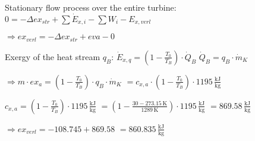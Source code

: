 Stationary flow process over the entire turbine:  
\( 0 = -\Delta ex_{str} + \sum \dot{E}_{x,i} - \sum W_i - E_{x,verl} \)  

\( \Rightarrow ex_{verl} = -\Delta ex_{str} + eva - 0 \)  

Exergy of the heat stream \( q_B \):  
\( \dot{E}_{x,q} = \left( 1 - \frac{T_0}{T_B} \right) \cdot \dot{Q}_B \)  
\( \dot{Q}_B = q_B \cdot \dot{m}_K \)  

\( \Rightarrow m \cdot ex_{a} = \left( 1 - \frac{T_0}{T_B} \right) \cdot q_B \cdot \dot{m}_K \)  
\( = c_{x,a} \cdot \left( 1 - \frac{T_0}{T_B} \right) \cdot 1195 \, \frac{\text{kJ}}{\text{kg}} \)  

\( c_{x,a} = \left( 1 - \frac{T_0}{T_B} \right) \cdot 1195 \, \frac{\text{kJ}}{\text{kg}} \)  
\( = \left( 1 - \frac{30 - 273.15 \, \text{K}}{1289 \, \text{K}} \right) \cdot 1195 \, \frac{\text{kJ}}{\text{kg}} \)  
\( = 869.58 \, \frac{\text{kJ}}{\text{kg}} \)  

\( \Rightarrow ex_{verl} = -108.745 + 869.58 \)  
\( = 860.835 \, \frac{\text{kJ}}{\text{kg}} \)